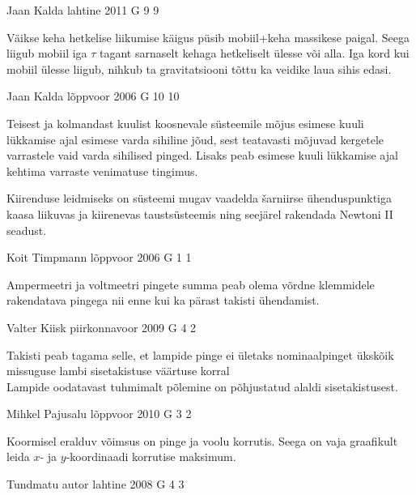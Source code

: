 \documentclass[11pt]{article}
\begin{document}
{%
{Jaan Kalda} %
{lahtine} %
{2011} %
{G 9} %
{9} %
{

\ifHint
Väikse keha hetkelise liikumise käigus püsib mobiil+keha massikese paigal. Seega liigub mobiil iga $\tau$ tagant sarnaselt kehaga hetkeliselt ülesse või alla. Iga kord kui mobiil ülesse liigub, nihkub ta gravitatsiooni tõttu ka veidike laua sihis edasi.
\fi
}

{Jaan Kalda} %
{lõppvoor} %
{2006} %
{G 10} %
{10} %
{

\ifHint
Teisest ja kolmandast kuulist koosnevale süsteemile mõjus esimese kuuli lükkamise ajal esimese varda sihiline jõud, sest teatavasti mõjuvad kergetele varrastele vaid varda sihilised pinged. Lisaks peab esimese kuuli lükkamise ajal kehtima varraste venimatuse tingimus.

Kiirenduse leidmiseks on süsteemi mugav vaadelda šarniirse ühenduspunktiga kaasa liikuvas ja kiirenevas taustsüsteemis ning seejärel rakendada Newtoni II seadust.
\fi
}

{Koit Timpmann} %
{lõppvoor} %
{2006} %
{G 1} %
{1} %
{

\ifHint
Ampermeetri ja voltmeetri pingete summa peab olema võrdne klemmidele rakendatava pingega nii enne kui ka pärast takisti ühendamist.
\fi
}

{Valter Kiisk} %
{piirkonnavoor} %
{2009} %
{G 4} %
{2} %
{

\ifHint
\osa Takisti peab tagama selle, et lampide pinge ei ületaks nominaalpinget ükskõik missuguse lambi sisetakistuse väärtuse korral\\
\osa Lampide oodatavast tuhmimalt põlemine on põhjustatud alaldi sisetakistusest.
\fi
}

{Mihkel Pajusalu} %
{lõppvoor} %
{2010} %
{G 3} %
{2} %
{

\ifHint
Koormisel eralduv võimsus on pinge ja voolu korrutis. Seega on vaja graafikult leida $x$- ja $y$-koordinaadi korrutise maksimum.
\fi
}

{Tundmatu autor} %
{lahtine} %
{2008} %
{G 4} %
{3} %
{

}}
\end{document}
